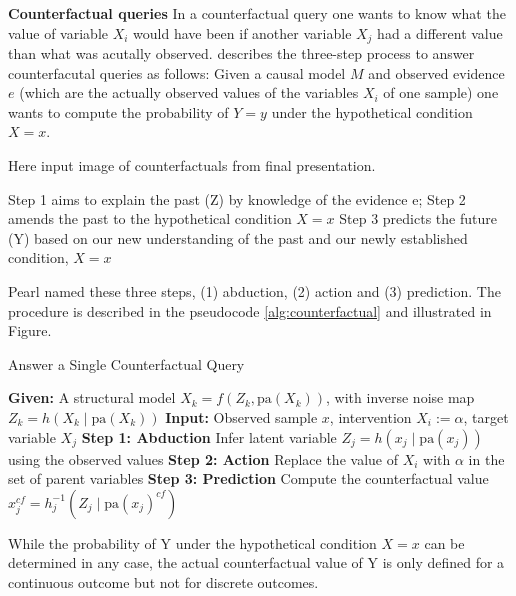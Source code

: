 \textbf{Counterfactual queries} In a counterfactual query one wants to know what the value of variable $X_i$ would have been if another variable $X_j$ had a different value than what was acutally observed. \citet{pearl_book2009} describes the three-step process to answer counterfacutal queries as follows: Given a causal model $M$ and observed evidence $e$ (which are the actually observed values of the variables $X_i$ of one sample) one wants to compute the probability of $Y=y$ under the hypothetical condition $X=x$.


Here input image of counterfactuals from final presentation.


Step 1 aims to explain the past (Z) by knowledge of the evidence e; 
Step 2 amends the past to the hypothetical condition $X=x$ 
Step 3 predicts the future (Y) based on our new understanding of the past and our newly established condition, $X =x$

Pearl named these three steps, (1) abduction,  (2) action and (3) prediction. The procedure is described in the pseudocode \ref{alg:counterfactual} and illustrated in Figure.

\begin{algorithm}
\caption{Answer a Single Counterfactual Query}
\label{alg:single_cf}
\begin{algorithmic}[1]
\State \textbf{Given:} A structural model $X_k = f(Z_k, \text{pa}(X_k))$, with inverse noise map $Z_k = h(X_k \mid \text{pa}(X_k))$
\State \textbf{Input:} Observed sample $x$, intervention $X_i := \alpha$, target variable $X_j$
\vspace{0.3em}
\State \textbf{Step 1: Abduction} Infer latent variable $Z_j = h(x_j \mid \text{pa}(x_j))$ using the observed values
\vspace{0.3em}
\State \textbf{Step 2: Action} Replace the value of $X_i$ with $\alpha$ in the set of parent variables
\vspace{0.3em}
\State \textbf{Step 3: Prediction} Compute the counterfactual value $x_j^{cf} = h_j^{-1}(Z_j \mid \text{pa}(x_j)^{cf})$
\vspace{0.3em}
\end{algorithmic}
\end{algorithm}



While the probability of Y under the hypothetical condition $X=x$ can be determined in any case, the actual counterfactual value of Y is only defined for a continuous outcome but not for discrete outcomes.


